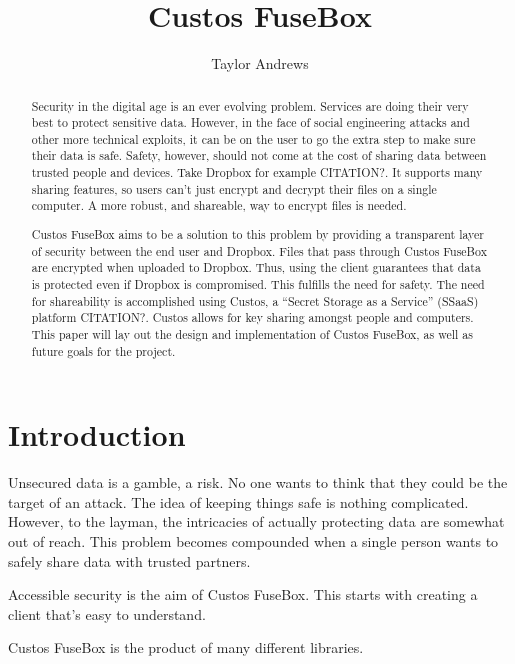 \documentclass[11pt,twocolumn,letterpaper]{article}
\newcommand{\appname}{Custos FuseBox }
\newcommand{\appnameWOspace}{Custos FuseBox}
\begin{document}
\title{\appname}

\author{Taylor Andrews}

\maketitle

\begin{abstract}
Security in the digital age is an ever evolving problem.
Services are doing their very best to protect sensitive data. 
However, in the face of social engineering attacks and other more technical
exploits, it can be on the user to go the extra step to make sure
their data is safe. Safety, however, should not come at the cost of
sharing data between trusted people and devices. Take Dropbox for
example CITATION?. It supports many sharing features, so users can't just
encrypt and decrypt their files on a single computer. A more robust,
and shareable, way to encrypt files is needed. 
\par \appname aims to be a solution to this problem by providing a
transparent layer of security between the end user and Dropbox. Files
that pass through \appname are encrypted when uploaded to Dropbox. 
Thus, using the client guarantees that data is protected even if 
Dropbox is compromised. This fulfills the need for safety. The need
for shareability
is accomplished using Custos, a ``Secret Storage as a Service''
(SSaaS) platform CITATION?. Custos allows for key sharing amongst
people and computers. This paper will lay out
the design and implementation of \appnameWOspace, as well as 
future goals for the project.    
\end{abstract}

\section{Introduction}
\label{sec:intro}
Unsecured data is a gamble, a risk. No one wants to think that
they could be the target of an attack. The idea of keeping things safe
is nothing complicated. However, to the layman, the intricacies of
actually protecting data are somewhat out of reach. This problem
becomes compounded when a single person wants to safely share data
with trusted partners.   
\par 
Accessible security is the aim of \appnameWOspace. This starts with
creating a client that's easy to understand. 
\par
\appname is the product of many different libraries. 
\end{document}

